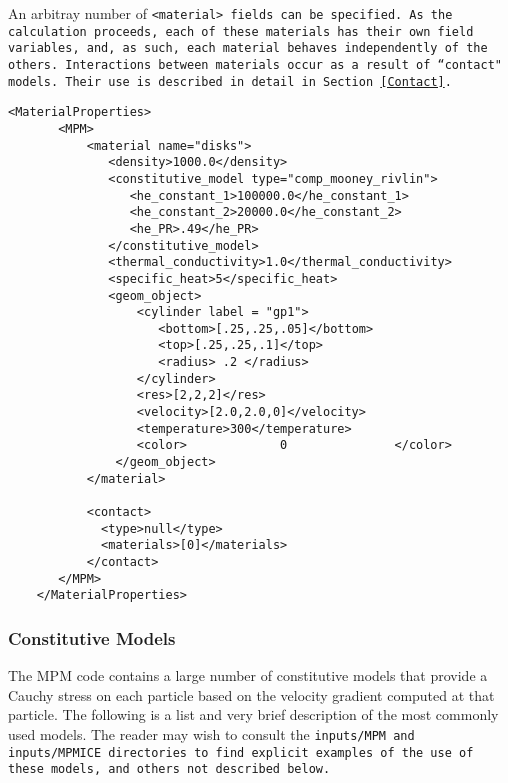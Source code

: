 An arbitray number of \tt <material> \normalfont fields can be specified.
As the calculation proceeds, each of these materials has their own field
variables, and, as such, each material behaves independently of the others.
Interactions between materials occur as a result of ``contact" models.
Their use is described in detail in Section~\ref{Contact}.

\begin{Verbatim}[fontsize=\footnotesize]
    <MaterialProperties>
       <MPM>
           <material name="disks">
              <density>1000.0</density>
              <constitutive_model type="comp_mooney_rivlin">
                 <he_constant_1>100000.0</he_constant_1>
                 <he_constant_2>20000.0</he_constant_2>
                 <he_PR>.49</he_PR>
              </constitutive_model>
              <thermal_conductivity>1.0</thermal_conductivity>
              <specific_heat>5</specific_heat>
              <geom_object>
                  <cylinder label = "gp1">
                     <bottom>[.25,.25,.05]</bottom>
                     <top>[.25,.25,.1]</top>
                     <radius> .2 </radius>
                  </cylinder>
                  <res>[2,2,2]</res>
                  <velocity>[2.0,2.0,0]</velocity>
                  <temperature>300</temperature>
                  <color>             0               </color>
               </geom_object>
           </material>

           <contact>
             <type>null</type>
             <materials>[0]</materials>
           </contact>
       </MPM>
    </MaterialProperties>
\end{Verbatim}

\subsubsection{Constitutive Models} \label{Sec:ConstitutiveModels}

The MPM code contains a large number of constitutive models that provide
a Cauchy stress on each particle based on the velocity gradient computed at
that particle.  The following is a list and very brief description of 
the most commonly used models.  The reader may wish to consult the
\tt inputs/MPM \normalfont and \tt inputs/MPMICE \normalfont directories
to find explicit examples of the use of these models, and others not
described below.

